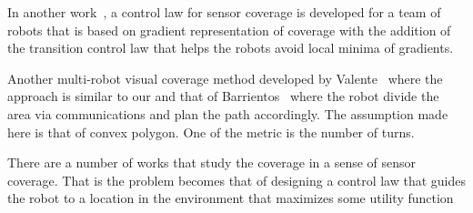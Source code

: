 \documentclass[../main.tex]{subfiles}
\begin{document}
In another work~\cite{atincc2013supervised}, a control law for sensor coverage is developed for a team of robots that is based on gradient representation of coverage with the addition of the transition control law that helps the robots avoid local minima of gradients.

Another multi-robot visual coverage method developed by Valente~\cite{valente2011multi} where the approach is similar to our and that of Barrientos~\cite{barrientos2011aerial} where the robot divide the area via communications and plan the path accordingly. The assumption made here is that of convex polygon. One of the metric is the number of turns.

There are a number of works that study the coverage in a sense of sensor coverage. That is the problem becomes that of designing a control law that guides the robot to a location in the environment that maximizes some utility function%
\end{document}

